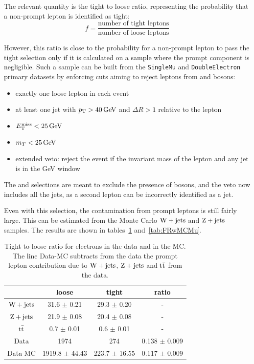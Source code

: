 The relevant quantity is the tight to loose ratio, representing the
probability that a non-prompt lepton is identified as tight:
\begin{equation*}
    f = \dfrac{\text{number of tight leptons}}{\text{number of loose
    leptons}}
\end{equation*}

However, this ratio is close to the probability for a non-prompt lepton to
pass the tight selection only if it is calculated on a sample where the
prompt component is negligible. Such a sample can be built from the
\texttt{SingleMu} and \texttt{DoubleElectron} primary datasets by enforcing
cuts aiming to reject leptons from \W and \Z bosons:
\begin{itemize}
    \item exactly one loose lepton in each event
    \item at least one jet with $\pt > \unit[40]{GeV}$ and $\Delta R > 1$
        relative to the lepton
    \item $\met < \unit[25]{GeV}$
    \item $\mt < \unit[25]{GeV}$
    \item extended \Z veto: reject the event if the invariant mass of the
        lepton and any jet is in the \unit[76-106]{GeV} window
\end{itemize}
The \met and \mt selections are meant to exclude the presence of \W bosons,
and the \Z veto now includes all the jets, as a second lepton can be incorrectly
identified as a jet.

Even with this selection, the contamination from prompt leptons is still
fairly large. This can be estimated from the Monte Carlo $\mathrm{W} + \text{jets}$ and
$\mathrm{Z} + \text{jets}$ samples. The results are shown in
tables~\ref{tab:FRwMCEl} and~\ref{tab:FRwMCMu}.
\begin{table}[htb]
\begin{center}
\begin{tabular}{*4c}
    \toprule
 & 	 loose & 	 tight & 	 ratio \\
 \midrule
 $\mathrm{W} + \text{jets}$ & 	31.6 $\pm$ 0.21 & 	29.3 $\pm$ 0.20 & 	     -     \\
$\mathrm{Z} + \text{jets}$ & 	21.9 $\pm$ 0.08 & 	20.4 $\pm$ 0.08 & 	     -     \\
$\mathrm{t}\bar{\mathrm{t}}$ & 	 0.7 $\pm$ 0.01 & 	 0.6 $\pm$ 0.01 & 	     -     \\
\midrule
Data & 	 1974 & 	  274 & 	0.138 $\pm$ 0.009 \\
Data-MC &	1919.8 $\pm$ 44.43 & 	223.7 $\pm$ 16.55 & 	0.117 $\pm$ 0.009 \\
\bottomrule
\end{tabular}
\caption{Tight to loose ratio for electrons in the data and in the MC. The line
    Data-MC subtracts from the data the prompt lepton contribution due to
    $\mathrm{W} + \text{jets}$, 
$\mathrm{Z} + \text{jets}$ and $\mathrm{t}\bar{\mathrm{t}}$ from the data.}
\label{tab:FRwMCEl}
\end{center}
\end{table}

